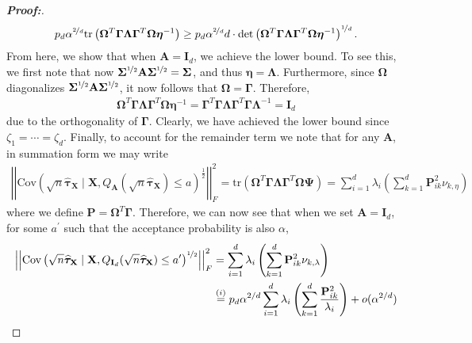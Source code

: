 \documentclass[11pt,twoside]{article}
\theoremstyle{definition}
\theoremstyle{remark}
\begin{document}
\begin{proof}[\textbf{Proof:}]
\begin{align*}
    p_d \alpha^{\nicefrac{2}{d}} \text{tr}\left(  \mathbf{\Omega}^T \mathbf{\Gamma} \mathbf{\Lambda} \mathbf{\Gamma}^T \mathbf{\Omega} \bm{\eta}^{-1}   \right) \geq   p_d \alpha^{\nicefrac{2}{d}} d\cdot \text{det}\left(  \mathbf{\Omega}^T \mathbf{\Gamma} \mathbf{\Lambda} \mathbf{\Gamma}^T \mathbf{\Omega} \bm{\eta}^{-1}   \right)^{\nicefrac{1}{d}}.
\end{align*}
From here, we show that when $\mathbf{A} = \mathbf{I}_d$, we achieve the lower bound. To see this, we first note that now $\mathbf{\Sigma}^{\nicefrac{1}{2}} \mathbf{A} \mathbf{\Sigma}^{\nicefrac{1}{2}} = \mathbf{\Sigma}$, and thus $\bm{\eta} = \mathbf{\Lambda}$. Furthermore, since $\mathbf{\Omega}$ diagonalizes $\mathbf{\Sigma}^{\nicefrac{1}{2}} \mathbf{A} \mathbf{\Sigma}^{\nicefrac{1}{2}}$, it now follows that $\mathbf{\Omega} = \mathbf{\Gamma}$. Therefore,
\begin{align*}
    \mathbf{\Omega}^T \mathbf{\Gamma} \mathbf{\Lambda} \mathbf{\Gamma}^T \mathbf{\Omega} \bm{\eta}^{-1} = \mathbf{\Gamma}^T \mathbf{\Gamma} \mathbf{\Lambda} \mathbf{\Gamma}^T \mathbf{\Gamma} \bm{\Lambda}^{-1} = \mathbf{I}_d
\end{align*}
due to the orthogonality of $\mathbf{\Gamma}$. Clearly, we have achieved the lower bound since $\zeta_1 = \cdots = \zeta_d$. Finally, to account for the remainder term we note that for any $\mathbf{A}$, in summation form we may write
\begin{align*}
    \left|\left|\text{Cov}\left(\sqrt{n}\widehat{\bm{\tau}}_{\mathbf{X}} \mid \mathbf{X}, Q_{\mathbf{A}}(\sqrt{n} \widehat{\bm{\tau}}_{\mathbf{X}}) \leq a\right)^{\frac{1}{2}}\right|\right|^2_F = \text{tr}\left(  \mathbf{\Omega}^T \mathbf{\Gamma} \mathbf{\Lambda} \mathbf{\Gamma}^T \mathbf{\Omega} \mathbf{\Psi}   \right) = \sum^d_{i=1} \lambda_i \left( \sum^d_{k = 1}  \mathbf{P}^2_{i k } \nu_{k, \eta} \right)
\end{align*}
where we define $\mathbf{P} = \mathbf{\Omega}^T \mathbf{\Gamma}$. Therefore, we can now see that when we set $\mathbf{A} = \mathbf{I}_d$, for some $a^\prime$ such that the acceptance probability is also $\alpha$,
\begin{align*}
        \left|\left|\text{Cov}\left(\sqrt{n}\widehat{\bm{\tau}}_{\mathbf{X}} \mid \mathbf{X}, Q_{\mathbf{I}_d}(\sqrt{n} \widehat{\bm{\tau}}_{\mathbf{X}}) \leq a^\prime \right)^{\nicefrac{1}{2}}\right|\right|^2_F &= \sum^d_{i=1} \lambda_i \left( \sum^d_{k = 1}  \mathbf{P}^2_{i k } \nu_{k, \lambda} \right) \\
        &\overset{(i)}{=}  p_d \alpha^{2/d}  \sum^d_{i=1} \lambda_i \left( \sum^d_{k = 1}  \frac{\mathbf{P}^2_{i k }}{\lambda_i} \right)  + o(\alpha^{2/d}) \\

\end{align*}
\end{proof}
\end{document}
